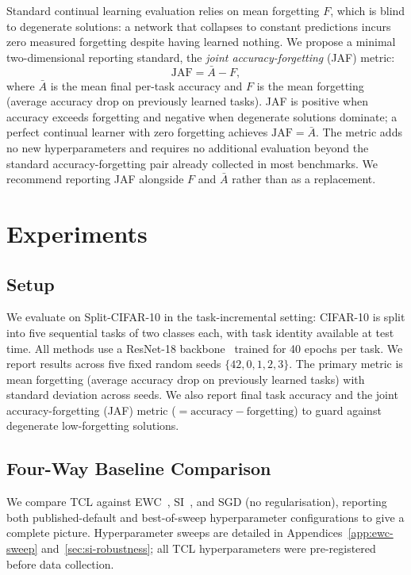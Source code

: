 \documentclass[10pt,a4paper]{article}
\begin{document}
Standard continual learning evaluation relies on mean forgetting $F$, which is blind
to degenerate solutions: a network that collapses to constant predictions incurs zero
measured forgetting despite having learned nothing.
We propose a minimal two-dimensional reporting standard, the \emph{joint
accuracy-forgetting} (JAF) metric:
\begin{equation}
    \mathrm{JAF} = \bar{A} - F,
    \label{eq:jaf}
\end{equation}
where $\bar{A}$ is the mean final per-task accuracy and $F$ is the mean forgetting
(average accuracy drop on previously learned tasks).
JAF is positive when accuracy exceeds forgetting and negative when degenerate
solutions dominate; a perfect continual learner with zero forgetting achieves
$\mathrm{JAF} = \bar{A}$.
The metric adds no new hyperparameters and requires no additional evaluation beyond
the standard accuracy-forgetting pair already collected in most benchmarks.
We recommend reporting JAF alongside $F$ and $\bar{A}$ rather than as a replacement.


\section{Experiments}
\label{sec:experiments}

\subsection{Setup}
\label{sec:setup}

We evaluate on Split-CIFAR-10 in the task-incremental setting: CIFAR-10 is split into
five sequential tasks of two classes each, with task identity available at test time.
All methods use a ResNet-18 backbone~\cite{He2016} trained for 40 epochs per task.
We report results across five fixed random seeds $\{42, 0, 1, 2, 3\}$.
The primary metric is mean forgetting (average accuracy drop on previously learned tasks)
with standard deviation across seeds. We also report final task accuracy and the joint
accuracy-forgetting (JAF) metric ($= \text{accuracy} - \text{forgetting}$) to guard
against degenerate low-forgetting solutions.

\subsection{Four-Way Baseline Comparison}
\label{sec:baseline}

We compare TCL against EWC~\cite{Kirkpatrick2017}, SI~\cite{Zenke2017}, and
SGD (no regularisation), reporting both published-default and
best-of-sweep hyperparameter configurations to give a complete picture.
Hyperparameter sweeps are detailed in Appendices~\ref{app:ewc-sweep}
and~\ref{sec:si-robustness}; all TCL hyperparameters were pre-registered before
data collection.
\end{document}

